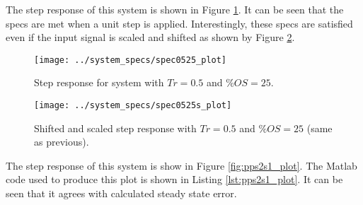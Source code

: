 \documentclass{article}
\newcommand{\sincludepdf}[2][]{
	
}
\begin{document}
\sincludepdf[pages={3},
			pagecommand=\subsection*{Example 1}\label{sfs:ex1},
		]{scan/11221301.pdf}

The step response of this system is shown in Figure \ref{fig:spec0525_plot}.
It can be seen that the specs are met when a unit step is applied.
Interestingly, these specs are satisfied even if the input signal is
scaled and shifted as shown by Figure \ref{fig:spec0525s_plot}.

\begin{figure}[h!]
\begin{center}
\texttt{[image: ../system\_specs/spec0525\_plot]}
\end{center}
\caption{Step response for system with $Tr = 0.5$ and $\%OS = 25$.}
\label{fig:spec0525_plot}
\end{figure}

\begin{figure}[h!]
\begin{center}
\texttt{[image: ../system\_specs/spec0525s\_plot]}
\end{center}
\caption{Shifted and scaled step response with $Tr = 0.5$
and $\%OS = 25$ (same as previous).}
\label{fig:spec0525s_plot}
\end{figure}


\clearpage
\sincludepdf[pages={3},
		pagecommand=\section{Final Value Theorem}
		]{scan/11241301.pdf}

\sincludepdf[pages={2},
	pagecommand=\section{Pole Placement (S-Domain)}\label{sec:pp}\subsection*{Example 1}\label{sec:pp:ex1}
	]{scan/11231301.pdf}
\sincludepdf[pages={3}]{scan/11231301.pdf}

\sincludepdf[pages={5}]{scan/11241301.pdf}

The step response of this system is show in Figure \ref{fig:pps2s1_plot}.
The Matlab code used to produce this plot is shown
in Listing \ref{lst:pps2s1_plot}.
It can be seen that it agrees with calculated steady state error.
\end{document}
